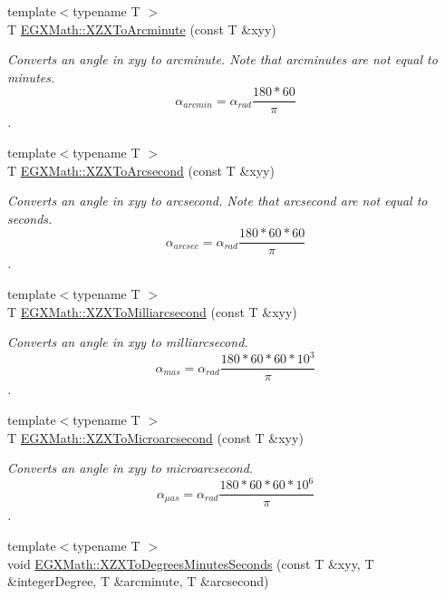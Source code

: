 \begin{DoxyCompactItemize}
{\footnotesize template$<$typename T $>$ }\\T \mbox{\hyperlink{group___e_g_x_math-_angle_conversions-_x_z_x_ga291a98dde605fdf092ba16acb2989b84}{E\+G\+X\+Math\+::\+X\+Z\+X\+To\+Arcminute}} (const T \&xyy)
\begin{DoxyCompactList}\small\item\em Converts an angle in xyy to arcminute. Note that arcminutes are not equal to minutes. \[\alpha_{arcmin}=\alpha_{rad}\frac{180 * 60}{\pi}\]. \end{DoxyCompactList}\item 
{\footnotesize template$<$typename T $>$ }\\T \mbox{\hyperlink{group___e_g_x_math-_angle_conversions-_x_z_x_gaebb234b957f08dcd4f84726bcd3cdf62}{E\+G\+X\+Math\+::\+X\+Z\+X\+To\+Arcsecond}} (const T \&xyy)
\begin{DoxyCompactList}\small\item\em Converts an angle in xyy to arcsecond. Note that arcsecond are not equal to seconds. \[\alpha_{arcsec}=\alpha_{rad}\frac{180 * 60 * 60}{\pi}\]. \end{DoxyCompactList}\item 
{\footnotesize template$<$typename T $>$ }\\T \mbox{\hyperlink{group___e_g_x_math-_angle_conversions-_x_z_x_ga164fd354ff7a249d92865b51beca40d2}{E\+G\+X\+Math\+::\+X\+Z\+X\+To\+Milliarcsecond}} (const T \&xyy)
\begin{DoxyCompactList}\small\item\em Converts an angle in xyy to milliarcsecond. \[\alpha_{mas}=\alpha_{rad}\frac{180 * 60 * 60 * 10^3}{\pi}\]. \end{DoxyCompactList}\item 
{\footnotesize template$<$typename T $>$ }\\T \mbox{\hyperlink{group___e_g_x_math-_angle_conversions-_x_z_x_ga4623e8e8a525449fdf051bae6185ace7}{E\+G\+X\+Math\+::\+X\+Z\+X\+To\+Microarcsecond}} (const T \&xyy)
\begin{DoxyCompactList}\small\item\em Converts an angle in xyy to microarcsecond. \[\alpha_{\mu as}=\alpha_{rad}\frac{180 * 60 * 60 * 10^6}{\pi}\]. \end{DoxyCompactList}\item 
{\footnotesize template$<$typename T $>$ }\\void \mbox{\hyperlink{group___e_g_x_math-_angle_conversions-_x_z_x_ga61b7b63e9e90044636c79b599e86fa2f}{E\+G\+X\+Math\+::\+X\+Z\+X\+To\+Degrees\+Minutes\+Seconds}} (const T \&xyy, T \&integer\+Degree, T \&arcminute, T \&arcsecond)

\end{DoxyCompactItemize}
